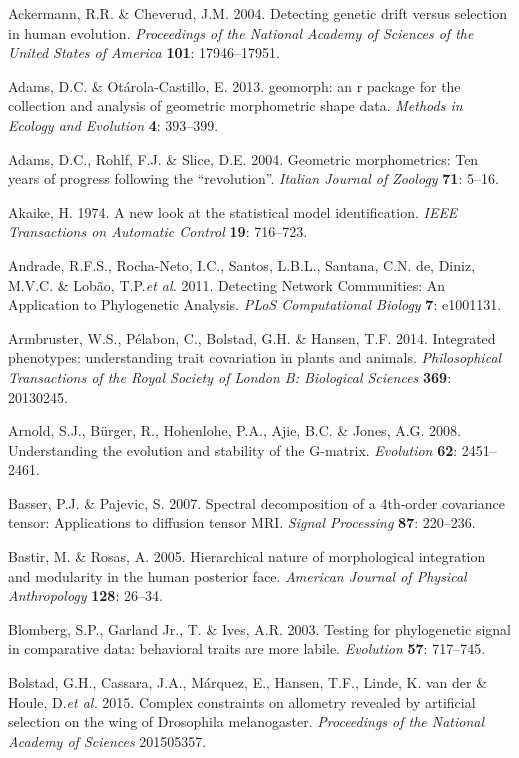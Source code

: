 \documentclass[12pt,twoside]{report}
\begin{document}

Ackermann, R.R. \& Cheverud, J.M. 2004. Detecting genetic drift versus
selection in human evolution. \emph{Proceedings of the National Academy
of Sciences of the United States of America} \textbf{101}: 17946--17951.

Adams, D.C. \& Otárola-Castillo, E. 2013. geomorph: an r package for the
collection and analysis of geometric morphometric shape data.
\emph{Methods in Ecology and Evolution} \textbf{4}: 393--399.

Adams, D.C., Rohlf, F.J. \& Slice, D.E. 2004. Geometric morphometrics:
Ten years of progress following the ``revolution''. \emph{Italian
Journal of Zoology} \textbf{71}: 5--16.

Akaike, H. 1974. A new look at the statistical model identification.
\emph{IEEE Transactions on Automatic Control} \textbf{19}: 716--723.

Andrade, R.F.S., Rocha-Neto, I.C., Santos, L.B.L., Santana, C.N. de,
Diniz, M.V.C. \& Lobão, T.P.\emph{et al.} 2011. Detecting Network
Communities: An Application to Phylogenetic Analysis. \emph{PLoS
Computational Biology} \textbf{7}: e1001131.

Armbruster, W.S., Pélabon, C., Bolstad, G.H. \& Hansen, T.F. 2014.
Integrated phenotypes: understanding trait covariation in plants and
animals. \emph{Philosophical Transactions of the Royal Society of London
B: Biological Sciences} \textbf{369}: 20130245.

Arnold, S.J., Bürger, R., Hohenlohe, P.A., Ajie, B.C. \& Jones, A.G.
2008. Understanding the evolution and stability of the G-matrix.
\emph{Evolution} \textbf{62}: 2451--2461.

Basser, P.J. \& Pajevic, S. 2007. Spectral decomposition of a 4th-order
covariance tensor: Applications to diffusion tensor MRI. \emph{Signal
Processing} \textbf{87}: 220--236.

Bastir, M. \& Rosas, A. 2005. Hierarchical nature of morphological
integration and modularity in the human posterior face. \emph{American
Journal of Physical Anthropology} \textbf{128}: 26--34.

Blomberg, S.P., Garland Jr., T. \& Ives, A.R. 2003. Testing for
phylogenetic signal in comparative data: behavioral traits are more
labile. \emph{Evolution} \textbf{57}: 717--745.

Bolstad, G.H., Cassara, J.A., Márquez, E., Hansen, T.F., Linde, K. van
der \& Houle, D.\emph{et al.} 2015. Complex constraints on allometry
revealed by artificial selection on the wing of Drosophila melanogaster.
\emph{Proceedings of the National Academy of Sciences} 201505357.
\end{document}

